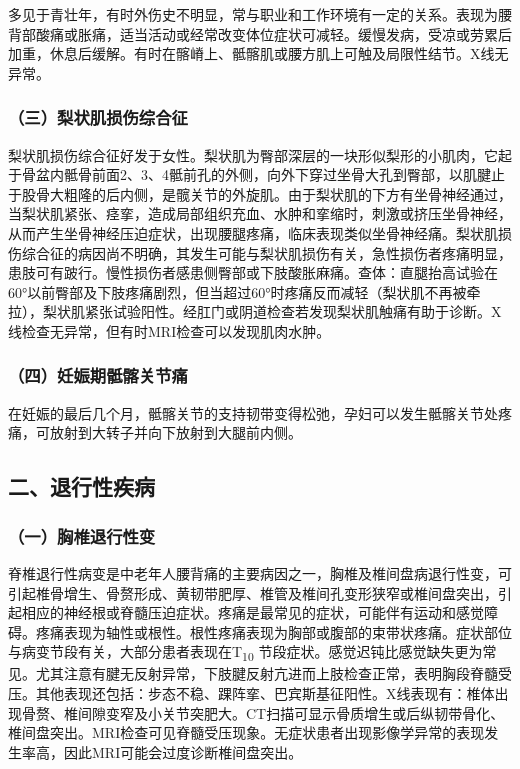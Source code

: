 多见于青壮年，有时外伤史不明显，常与职业和工作环境有一定的关系。表现为腰背部酸痛或胀痛，适当活动或经常改变体位症状可减轻。缓慢发病，受凉或劳累后加重，休息后缓解。有时在髂嵴上、骶髂肌或腰方肌上可触及局限性结节。X线无异常。

\subsubsection{（三）梨状肌损伤综合征}

梨状肌损伤综合征好发于女性。梨状肌为臀部深层的一块形似梨形的小肌肉，它起于骨盆内骶骨前面2、3、4骶前孔的外侧，向外下穿过坐骨大孔到臀部，以肌腱止于股骨大粗隆的后内侧，是髋关节的外旋肌。由于梨状肌的下方有坐骨神经通过，当梨状肌紧张、痉挛，造成局部组织充血、水肿和挛缩时，刺激或挤压坐骨神经，从而产生坐骨神经压迫症状，出现腰腿疼痛，临床表现类似坐骨神经痛。梨状肌损伤综合征的病因尚不明确，其发生可能与梨状肌损伤有关，急性损伤者疼痛明显，患肢可有跛行。慢性损伤者感患侧臀部或下肢酸胀麻痛。查体：直腿抬高试验在60°以前臀部及下肢疼痛剧烈，但当超过60°时疼痛反而减轻（梨状肌不再被牵拉），梨状肌紧张试验阳性。经肛门或阴道检查若发现梨状肌触痛有助于诊断。X线检查无异常，但有时MRI检查可以发现肌肉水肿。

\subsubsection{（四）妊娠期骶髂关节痛}

在妊娠的最后几个月，骶髂关节的支持韧带变得松弛，孕妇可以发生骶髂关节处疼痛，可放射到大转子并向下放射到大腿前内侧。

\subsection{二、退行性疾病}

\subsubsection{（一）胸椎退行性变}

脊椎退行性病变是中老年人腰背痛的主要病因之一，胸椎及椎间盘病退行性变，可引起椎骨增生、骨赘形成、黄韧带肥厚、椎管及椎间孔变形狭窄或椎间盘突出，引起相应的神经根或脊髓压迫症状。疼痛是最常见的症状，可能伴有运动和感觉障碍。疼痛表现为轴性或根性。根性疼痛表现为胸部或腹部的束带状疼痛。症状部位与病变节段有关，大部分患者表现在T\textsubscript{10}
节段症状。感觉迟钝比感觉缺失更为常见。尤其注意有腱无反射异常，下肢腱反射亢进而上肢检查正常，表明胸段脊髓受压。其他表现还包括：步态不稳、踝阵挛、巴宾斯基征阳性。X线表现有：椎体出现骨赘、椎间隙变窄及小关节突肥大。CT扫描可显示骨质增生或后纵韧带骨化、椎间盘突出。MRI检查可见脊髓受压现象。无症状患者出现影像学异常的表现发生率高，因此MRI可能会过度诊断椎间盘突出。


